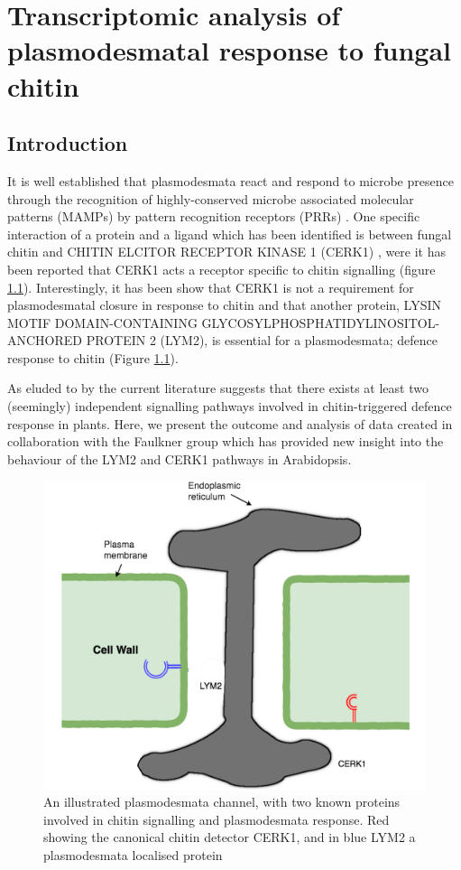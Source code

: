 \documentclass[../main.tex]{subfiles}
\begin{document}
\chapter{Transcriptomic analysis of plasmodesmatal response to fungal chitin}
\label{cha:transcripts}

\section{Introduction}
It is well established that plasmodesmata react and respond to microbe presence
through the recognition of highly-conserved microbe associated molecular
patterns (MAMPs) by pattern recognition receptors (PRRs)
\cite{zipfelPlantPatternrecognitionReceptors2014a,
  chevalPlasmodesmalRegulationPlant2018}. One specific interaction of a protein
and a ligand which has been identified is between fungal chitin and CHITIN
ELCITOR RECEPTOR KINASE 1 (CERK1) \cite{miyaCERK1LysMReceptor2007}, were it has
been reported that CERK1 acts a receptor specific to chitin signalling (figure
\ref{fig:receptors}). Interestingly, it has been show that CERK1 is not a
requirement for plasmodesmatal closure in response to chitin and that another
protein, LYSIN MOTIF DOMAIN-CONTAINING GLYCOSYLPHOSPHATIDYLINOSITOL-ANCHORED
PROTEIN 2 (LYM2), is essential for a plasmodesmata; defence response to chitin
\cite{Faulkner2013} (Figure \ref{fig:receptors}).

As eluded to by \citet{Faulkner2013} the current literature suggests that there
exists at least two (seemingly) independent signalling pathways involved in
chitin-triggered defence response in plants. Here, we present the outcome and
analysis of data created in collaboration with the Faulkner group which has
provided new insight into the behaviour of the LYM2 and CERK1 pathways in
Arabidopsis.


\begin{figure}[ht]
  \centering
  \includegraphics[width=0.5\columnwidth]{figures/original desmotubule.png}
  \caption[Plasmodesmata, \textit{lym2-1} and\textit{cerk2-1}diagram]{\label{fig:receptors}
    An illustrated plasmodesmata channel, with two
    known proteins involved in chitin signalling and plasmodesmata response. Red
    showing the canonical chitin detector CERK1, and in blue LYM2 a
    plasmodesmata localised protein}
\end{figure}
\end{document}
